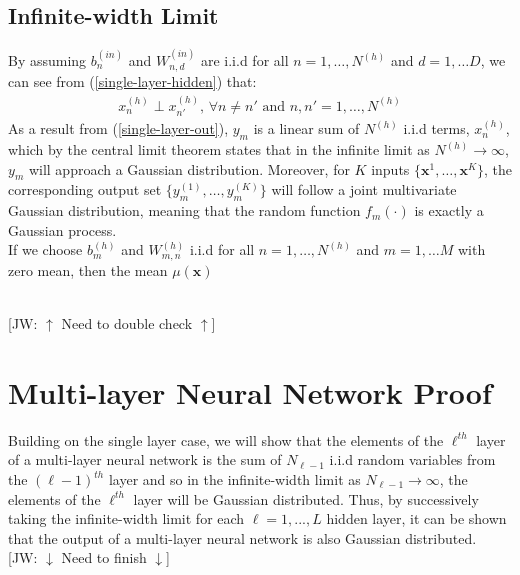 \documentclass[twoside,11pt]{article}
\newcommand{\jw}[1]{{\color{gray} [JW: #1]}}
\begin{document}
\subsection{Infinite-width Limit}
By assuming $b_n^{(in)}$ and $W_{n, d}^{(in)}$ are i.i.d for all $n=1,\dots, N^{(h)}$ and $d = 1, \dots D$, we can see from (\ref{single-layer-hidden}) that:
\begin{align}
    x_{n}^{(h)} \perp x_{n'}^{(h)} \text{, } \forall n \neq n' \text{ and } n, n' = 1, \dots, N^{(h)} 
\end{align}
As a result from (\ref{single-layer-out}), $y_m$ is a linear sum of $N^{(h)}$ i.i.d terms, $x_{n}^{(h)}$, which by the central limit theorem states that in the infinite limit as $N^{(h)} \rightarrow \infty$, $y_m$ will approach a Gaussian distribution. Moreover, for $K$ inputs $\{\textbf{x}^1, \dots, \textbf{x}^K\}$, the corresponding output set $\{y_m^{(1)}, \dots, y_m^{(K)}\}$ will follow a joint multivariate Gaussian distribution, meaning that the random function $f_m(\cdot)$ is exactly a Gaussian process.\\
If we choose $b_m^{(h)}$ and $W_{m, n}^{(h)}$ i.i.d for all $n=1,\dots, N^{(h)}$ and $m = 1, \dots M$ with zero mean, then the mean $\mu(\textbf{x})$

\\\jw{$\uparrow$ Need to double check $\uparrow$}


\section{Multi-layer Neural Network Proof \cite{lee2018deep}}
Building on the single layer case, we will show that the elements of the $\ell^{th}$ layer of a multi-layer neural network is the sum of $N_{\ell-1}$ i.i.d random variables from the  $(\ell-1)^{th}$ layer and so in the infinite-width limit as $N_{\ell-1} \rightarrow \infty$, the elements of the $\ell^{th}$ layer will be Gaussian distributed. Thus, by successively taking the infinite-width limit for each $\ell=1,...,L$ hidden layer, it can be shown that the output of a multi-layer neural network is also Gaussian distributed.
\\\jw{$\downarrow$ Need to finish $\downarrow$}
\end{document}
